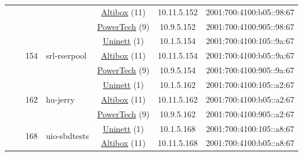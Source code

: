 \begin{small}
\begin{center}
\begin{longtable}{|c|c|c|c|c|c|c|c|}
  &  &  &  & \multicolumn{2}{|c|}{\tiny{\href{https://www.altibox.no}{Altibox} (11)}} & \tiny{10.11.5.152} & \tiny{2001:700:4100:b05::98:67} \\* \cline{5-5}\cline{6-6}\cline{7-7}\cline{8-8}
  &  &  &  & \multicolumn{2}{|c|}{\tiny{\href{http://www.powertech.no}{PowerTech} (9)}} & \tiny{10.9.5.152} & \tiny{2001:700:4100:905::98:67} \\* \cline{3-3}\cline{4-4}\cline{5-5}\cline{6-6}\cline{7-7}\cline{8-8}
  &  & \multirow{3}{*}{\tiny{154}} & \multicolumn{1}{|l|}{\multirow{3}{*}{\tiny{srl-rserpool}}} & \multicolumn{2}{|c|}{\tiny{\href{https://www.uninett.no}{Uninett} (1)}} & \tiny{10.1.5.154} & \tiny{2001:700:4100:105::9a:67} \\* \cline{5-5}\cline{6-6}\cline{7-7}\cline{8-8}
  &  &  &  & \multicolumn{2}{|c|}{\tiny{\href{https://www.altibox.no}{Altibox} (11)}} & \tiny{10.11.5.154} & \tiny{2001:700:4100:b05::9a:67} \\* \cline{5-5}\cline{6-6}\cline{7-7}\cline{8-8}
  &  &  &  & \multicolumn{2}{|c|}{\tiny{\href{http://www.powertech.no}{PowerTech} (9)}} & \tiny{10.9.5.154} & \tiny{2001:700:4100:905::9a:67} \\* \cline{3-3}\cline{4-4}\cline{5-5}\cline{6-6}\cline{7-7}\cline{8-8}
  &  & \multirow{3}{*}{\tiny{162}} & \multicolumn{1}{|l|}{\multirow{3}{*}{\tiny{hu-jerry}}} & \multicolumn{2}{|c|}{\tiny{\href{https://www.uninett.no}{Uninett} (1)}} & \tiny{10.1.5.162} & \tiny{2001:700:4100:105::a2:67} \\* \cline{5-5}\cline{6-6}\cline{7-7}\cline{8-8}
  &  &  &  & \multicolumn{2}{|c|}{\tiny{\href{https://www.altibox.no}{Altibox} (11)}} & \tiny{10.11.5.162} & \tiny{2001:700:4100:b05::a2:67} \\* \cline{5-5}\cline{6-6}\cline{7-7}\cline{8-8}
  &  &  &  & \multicolumn{2}{|c|}{\tiny{\href{http://www.powertech.no}{PowerTech} (9)}} & \tiny{10.9.5.162} & \tiny{2001:700:4100:905::a2:67} \\* \cline{3-3}\cline{4-4}\cline{5-5}\cline{6-6}\cline{7-7}\cline{8-8}
  &  & \multirow{3}{*}{\tiny{168}} & \multicolumn{1}{|l|}{\multirow{3}{*}{\tiny{uio-sbdtests}}} & \multicolumn{2}{|c|}{\tiny{\href{https://www.uninett.no}{Uninett} (1)}} & \tiny{10.1.5.168} & \tiny{2001:700:4100:105::a8:67} \\* \cline{5-5}\cline{6-6}\cline{7-7}\cline{8-8}
  &  &  &  & \multicolumn{2}{|c|}{\tiny{\href{https://www.altibox.no}{Altibox} (11)}} & \tiny{10.11.5.168} & \tiny{2001:700:4100:b05::a8:67} \\* \cline{5-5}\cline{6-6}\cline{7-7}\cline{8-8}

\end{longtable}
\end{center}
\end{small}
